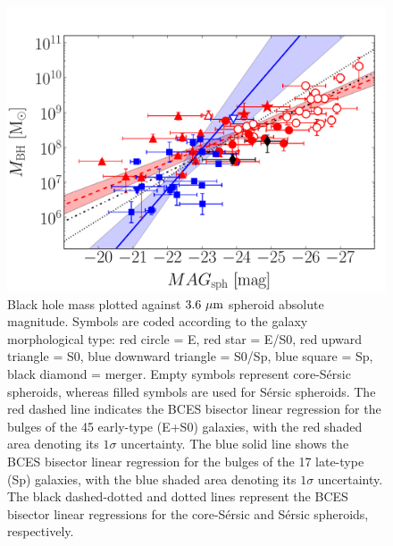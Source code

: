 \documentclass[preprint2]{emulateapj}
\begin{document}
\begin{figure}[h]
\begin{center}
\includegraphics[width=\columnwidth]{images/mbh_vs_mag_sph.pdf}
\caption{Black hole mass plotted against $3.6\rm~\mu m$ spheroid absolute magnitude. 
Symbols are coded according to the galaxy morphological type: red circle = E, red star = E/S0, 
red upward triangle = S0, blue downward triangle = S0/Sp, blue square = Sp, black diamond = merger. 
Empty symbols represent core-S\'ersic spheroids, whereas filled symbols are used for S\'ersic spheroids. 
The red dashed line indicates the BCES bisector linear regression for the bulges of the 45 early-type (E+S0) galaxies, 
with the red shaded area denoting its $1\sigma$ uncertainty. 
The blue solid line shows the BCES bisector linear regression for the bulges of the 17 late-type (Sp) galaxies, 
with the blue shaded area denoting its $1\sigma$ uncertainty. 
The black dashed-dotted and dotted lines represent the BCES bisector linear regressions for the core-S\'ersic and S\'ersic spheroids, respectively.}
\label{fig:mbhmagsph}
\end{center}
\end{figure}
\end{document}
